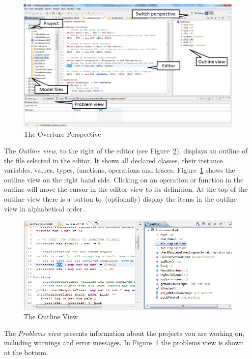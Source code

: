 \begin{figure}[!htb]
\begin{center}
  \includegraphics[width=4.5in]{figures/OverturePerspectiveRT}
  \caption[labelInTOC]{The Overture Perspective}
  \label{fig:userguide:OverturePerspective}
\end{center}
\end{figure}

The \emph{Outline view}, to the right of the editor (see
Figure~\ref{fig:userguide:OutlineView}), displays an outline of the
file selected in the editor. It shows all declared classes, their
instance variables, values, types, functions, operations and traces.
Figure~\ref{fig:userguide:OverturePerspective} shows the outline view
on the right hand side. Clicking on an operation or function in the
outline will move the cursor in the editor view to its definition. At
the top of the outline view there is a button to~(optionally) display
the items in the outline view in alphabetical order.

\begin{figure}[!h]
\begin{center}
  \includegraphics[width=4.5in]{figures/OutlineViewRT}
  \caption[labelInTOC]{The Outline View}
  \label{fig:userguide:OutlineView}
\end{center}
\end{figure}

The \emph{Problems view} presents information about the projects you
are working on, including warnings and error messages. In
Figure~\ref{fig:userguide:OverturePerspective} the problems view is
shown at the bottom.

